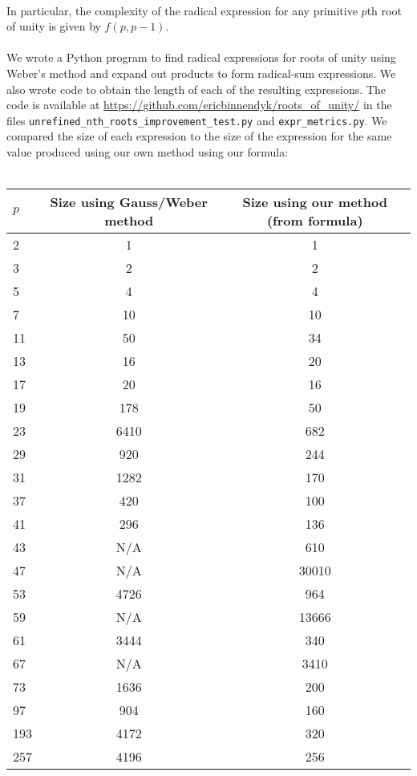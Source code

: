 \documentclass{article}
\begin{document}
    \\
    In particular, the complexity of the radical expression for any primitive $ p $th root of unity is given by $ f(p, p - 1) $.\\
    \\
    We wrote a Python program to find radical expressions for roots of unity using Weber's method and expand out products to form radical-sum expressions. We also wrote code to obtain the length of each of the resulting expressions. The code is available at \url{https://github.com/ericbinnendyk/roots_of_unity/} in the files \verb|unrefined_nth_roots_improvement_test.py| and \verb|expr_metrics.py|. We compared the size of each expression to the size of the expression for the same value produced using our own method using our formula:\\
    \\
    \begin{tabular}{l|c|c}
        $ p $ & Size using Gauss/Weber method & Size using our method (from formula)\\
        \hline
        2 & 1 & 1\\
        3 & 2 & 2\\
        5 & 4 & 4\\
        7 & 10 & 10\\
        11 & 50 & 34\\
        13 & 16 & 20\\
        17 & 20 & 16\\
        19 & 178 & 50\\
        23 & 6410 & 682\\
        29 & 920 & 244\\
        31 & 1282 & 170\\
        37 & 420 & 100\\
        41 & 296 & 136\\
        43 & N/A & 610\\
        47 & N/A & 30010\\
        53 & 4726 & 964\\
        59 & N/A & 13666\\
        61 & 3444 & 340\\
        67 & N/A & 3410\\
        73 & 1636 & 200\\
        97 & 904 & 160\\
        193 & 4172 & 320\\
        257 & 4196 & 256\\
    \end{tabular}
\end{document}
